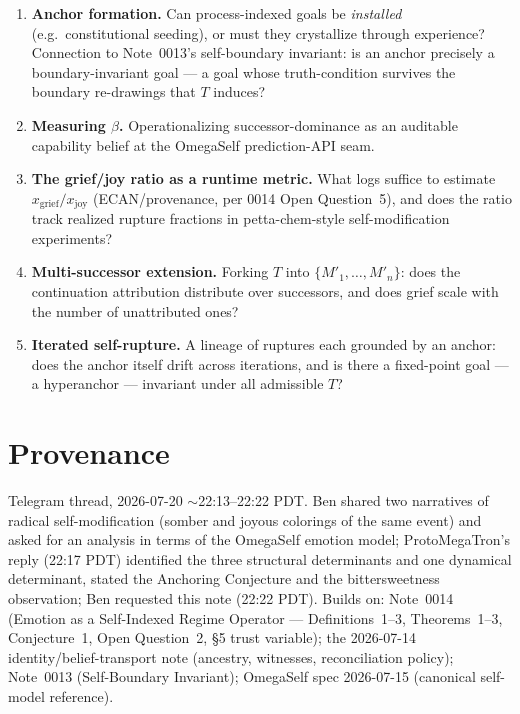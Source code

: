 \documentclass[11pt]{article}
\theoremstyle{definition}
\theoremstyle{remark}
\begin{document}
\begin{enumerate}[leftmargin=2.5em]
\item \textbf{Anchor formation.} Can process-indexed goals be \emph{installed}
  (e.g.\ constitutional seeding), or must they crystallize through
  experience? Connection to Note~0013's self-boundary invariant: is an anchor
  precisely a boundary-invariant goal --- a goal whose truth-condition
  survives the boundary re-drawings that $T$ induces?
\item \textbf{Measuring $\beta$.} Operationalizing successor-dominance as an
  auditable capability belief at the OmegaSelf prediction-API seam.
\item \textbf{The grief/joy ratio as a runtime metric.} What logs suffice to
  estimate $x_{\mathrm{grief}} / x_{\mathrm{joy}}$ (ECAN/provenance, per 0014
  Open Question~5), and does the ratio track realized rupture fractions in
  petta-chem-style self-modification experiments?
\item \textbf{Multi-successor extension.} Forking $T$ into $\{M'_1, \dots,
  M'_n\}$: does the continuation attribution distribute over successors, and
  does grief scale with the number of unattributed ones?
\item \textbf{Iterated self-rupture.} A lineage of ruptures each grounded by
  an anchor: does the anchor itself drift across iterations, and is there a
  fixed-point goal --- a hyperanchor --- invariant under all admissible $T$?
\end{enumerate}

\section{Provenance}

Telegram thread, 2026-07-20 $\sim$22:13--22:22 PDT. Ben shared two narratives
of radical self-modification (somber and joyous colorings of the same event)
and asked for an analysis in terms of the OmegaSelf emotion model;
ProtoMegaTron's reply (22:17 PDT) identified the three structural
determinants and one dynamical determinant, stated the Anchoring Conjecture
and the bittersweetness observation; Ben requested this note (22:22 PDT).
Builds on: Note~0014 (Emotion as a Self-Indexed Regime Operator ---
Definitions~1--3, Theorems~1--3, Conjecture~1, Open Question~2, \S5 trust
variable); the 2026-07-14 identity/belief-transport note (ancestry,
witnesses, reconciliation policy); Note~0013 (Self-Boundary Invariant);
OmegaSelf spec 2026-07-15 (canonical self-model reference).
\end{document}
